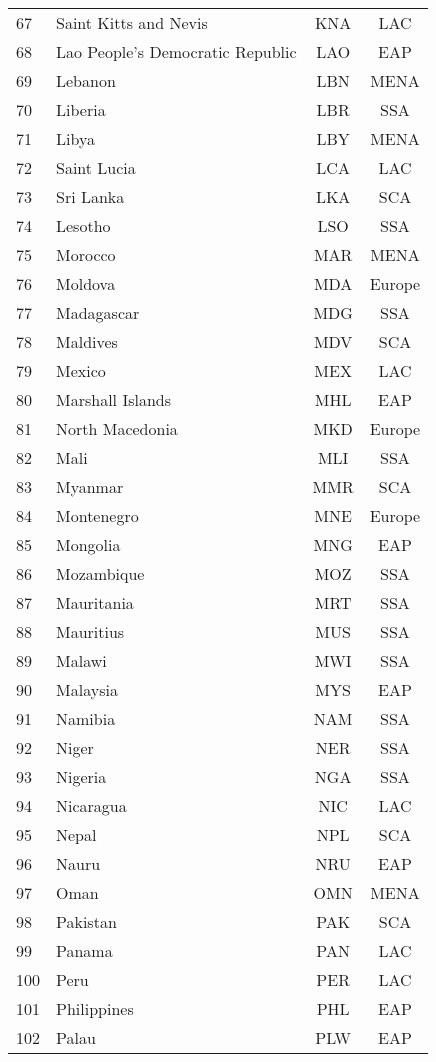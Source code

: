 {\begin{longtable}{l l c c}
  67 & Saint Kitts and Nevis & KNA & LAC \\ 
  68 & Lao People's Democratic Republic & LAO & EAP \\ 
  69 & Lebanon & LBN & MENA \\ 
  70 & Liberia & LBR & SSA \\ 
  71 & Libya & LBY & MENA \\ 
  72 & Saint Lucia & LCA & LAC \\ 
  73 & Sri Lanka & LKA & SCA \\ 
  74 & Lesotho & LSO & SSA \\ 
  75 & Morocco & MAR & MENA \\ 
  76 & Moldova & MDA & Europe \\ 
  77 & Madagascar & MDG & SSA \\ 
  78 & Maldives & MDV & SCA \\ 
  79 & Mexico & MEX & LAC \\ 
  80 & Marshall Islands & MHL & EAP \\ 
  81 & North Macedonia & MKD & Europe \\ 
  82 & Mali & MLI & SSA \\ 
  83 & Myanmar & MMR & SCA \\ 
  84 & Montenegro & MNE & Europe \\ 
  85 & Mongolia & MNG & EAP \\ 
  86 & Mozambique & MOZ & SSA \\ 
  87 & Mauritania & MRT & SSA \\ 
  88 & Mauritius & MUS & SSA \\ 
  89 & Malawi & MWI & SSA \\ 
  90 & Malaysia & MYS & EAP \\ 
  91 & Namibia & NAM & SSA \\ 
  92 & Niger & NER & SSA \\ 
  93 & Nigeria & NGA & SSA \\ 
  94 & Nicaragua & NIC & LAC \\ 
  95 & Nepal & NPL & SCA \\ 
  96 & Nauru & NRU & EAP \\ 
  97 & Oman & OMN & MENA \\ 
  98 & Pakistan & PAK & SCA \\ 
  99 & Panama & PAN & LAC \\ 
  100 & Peru & PER & LAC \\ 
  101 & Philippines & PHL & EAP \\ 
  102 & Palau & PLW & EAP \\ 

\end{longtable}}
